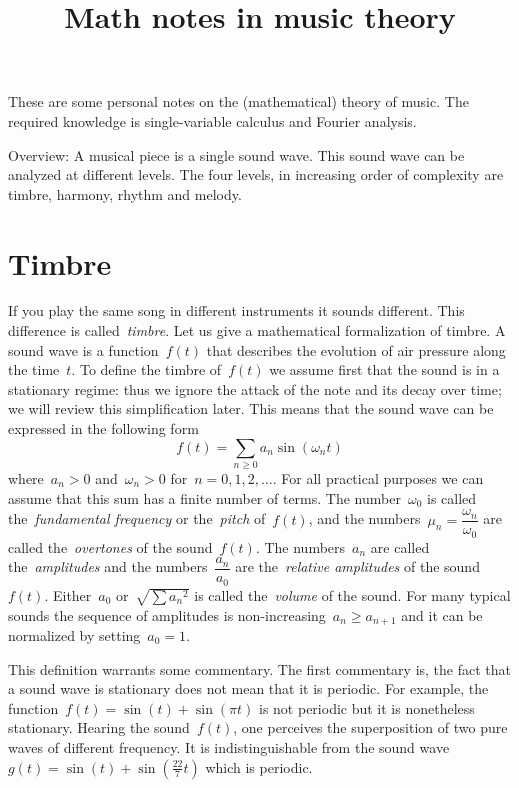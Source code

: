 \title{Math notes in music theory}

These are some personal notes on the (mathematical) theory of music.
The required knowledge is single-variable calculus and Fourier analysis.

Overview: A musical piece is a single sound wave.  This sound wave can be
analyzed at different levels.  The four levels, in increasing order of
complexity are timbre, harmony, rhythm and melody.

\section{Timbre}

If you play the same song in different instruments it sounds
different.  This difference is called~\emph{timbre}.
Let us give a mathematical formalization of timbre.
A sound wave is a function~$f(t)$ that describes the evolution of air
pressure along the time~$t$.  To define the timbre of~$f(t)$ we assume first
that the sound is in a stationary regime: thus we ignore the attack of the note
and its decay over time; we will review this simplification later.  This means
that the sound wave can be expressed in the following form
\begin{equation}\label{eq:soundwave}
	f(t) = \sum_{n\ge 0} a_n\sin\left(\omega_n t\right)
\end{equation}
where~$a_n>0$ and~$\omega_n>0$ for~$n=0,1,2,\ldots$.  For all practical
purposes we can assume that this sum has a finite number of terms.  The
number~$\omega_0$ is called the~\emph{fundamental frequency} or
the~\emph{pitch} of~$f(t)$, and the numbers~$\mu_n=\dfrac{\omega_n}{\omega_0}$
are called the~\emph{overtones} of the sound~$f(t)$.  The numbers~$a_n$ are
called the~\emph{amplitudes} and the numbers~$\dfrac{a_n}{a_0}$ are
the~\emph{relative amplitudes} of the sound~$f(t)$.  Either~$a_0$
or~$\sqrt{\sum {a_n}^2}$ is called the~\emph{volume} of the
sound.  For many typical sounds the sequence of amplitudes is
non-increasing~$a_n\ge a_{n+1}$ and it can be normalized by setting~$a_0=1$.

This definition warrants some commentary.  The first commentary is, the fact
that a sound wave is stationary does not mean that it is periodic.  For
example, the function~$f(t)=\sin(t)+\sin(\pi t)$ is not periodic but it is
nonetheless stationary.  Hearing the sound~$f(t)$, one perceives the
superposition of two pure waves of different frequency.  It is
indistinguishable from the sound
wave~$g(t)=\sin(t)+\sin\left(\tfrac{22}7t\right)$ which is periodic.

